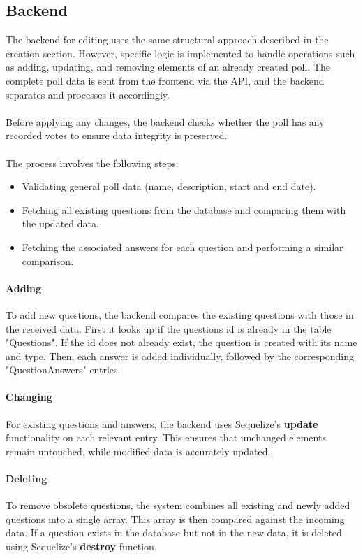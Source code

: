 \documentclass[a4paper,12pt]{report}
\begin{document}
\subsection{Backend}
The backend for editing uses the same structural approach described in the creation section. However, specific logic is implemented to handle operations such as adding, updating, and removing elements of an already created poll. The complete poll data is sent from the frontend via the API, and the backend separates and processes it accordingly. \\ \\
Before applying any changes, the backend checks whether the poll has any recorded votes to ensure data integrity is preserved. \\ \\
The process involves the following steps:
\begin{itemize}
	\item Validating general poll data (name, description, start and end date).
	\item Fetching all existing questions from the database and comparing them with the updated data.
	\item Fetching the associated answers for each question and performing a similar comparison.
\end{itemize}

\paragraph{Adding}
To add new questions, the backend compares the existing questions with those in the received data. First it looks up if the questions id is already in the table "Questions". If the id does not already exist, the question is created with its name and type. Then, each answer is added individually, followed by the corresponding "QuestionAnswers" entries.

\paragraph{Changing}
For existing questions and answers, the backend uses Sequelize's \textbf{update} functionality on each relevant entry. This ensures that unchanged elements remain untouched, while modified data is accurately updated.

\paragraph{Deleting}
To remove obsolete questions, the system combines all existing and newly added questions into a single array. This array is then compared against the incoming data. If a question exists in the database but not in the new data, it is deleted using Sequelize’s \textbf{destroy} function. \\ 
\end{document}
